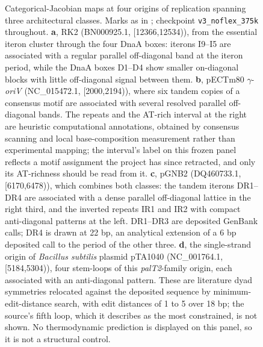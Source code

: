 \begin{figure}[h]
    \centering
\caption{
Categorical-Jacobian maps at four origins of replication spanning three architectural classes. Marks as in ; checkpoint \texttt{v3\_noflex\_375k} throughout. \textbf{a}, RK2 (BN000925.1, [12366,12534)), from the essential iteron cluster through the four DnaA boxes: iterons I9--I5 are associated with a regular parallel off-diagonal band at the iteron period, while the DnaA boxes D1--D4 show smaller on-diagonal blocks with little off-diagonal signal between them. \textbf{b}, pECTm80 $\gamma$-\emph{oriV} (NC\_015472.1, [2000,2194)), where six tandem copies of a consensus motif are associated with several resolved parallel off-diagonal bands. The repeats and the AT-rich interval at the right are heuristic computational annotations, obtained by consensus scanning and local base-composition measurement rather than experimental mapping; the interval's label on this frozen panel reflects a motif assignment the project has since retracted, and only its AT-richness should be read from it. \textbf{c}, pGNB2 (DQ460733.1, [6170,6478)), which combines both classes: the tandem iterons DR1--DR4 are associated with a dense parallel off-diagonal lattice in the right third, and the inverted repeats IR1 and IR2 with compact anti-diagonal patterns at the left. DR1--DR3 are deposited GenBank calls; DR4 is drawn at 22 bp, an analytical extension of a 6 bp deposited call to the period of the other three. \textbf{d}, the single-strand origin of \emph{Bacillus subtilis} plasmid pTA1040 (NC\_001764.1, [5184,5304)), four stem-loops of this \emph{palT2}-family origin, each associated with an anti-diagonal pattern. These are literature dyad symmetries relocated against the deposited sequence by minimum-edit-distance search, with edit distances of 1 to 5 over 18 bp; the source's fifth loop, which it describes as the most constrained, is not shown. No thermodynamic prediction is displayed on this panel, so it is not a structural control.
}
\label{fig:supp-oriv-maps}
\end{figure}

